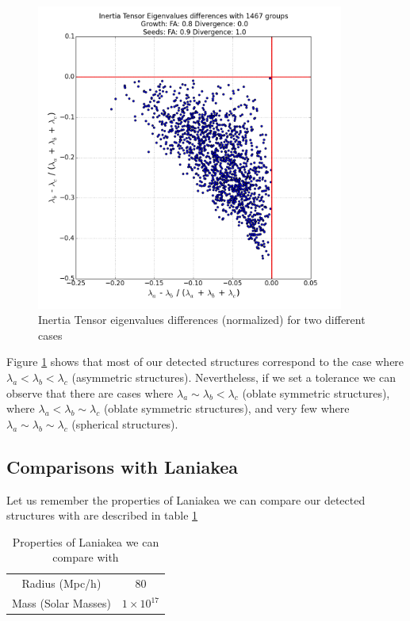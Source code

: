 \documentclass[12pt]{article}
\begin{document}
\begin{figure}[ht]
\begin{minipage}{.5\textwidth}
  \includegraphics[width=0.9\textwidth]{groups/inertiaplots/inertia_diff_09_Trace_10_search_FA_08_Trace_00.png}
\end{minipage}
\caption{Inertia Tensor eigenvalues differences (normalized) for two different cases}
\label{fg:inertia_diff}
\end{figure}
\FloatBarrier

\begin{par}
Figure \ref{fg:inertia_diff} shows that most of our
 detected structures correspond to the case where
  $\lambda_a < \lambda_b < \lambda_c$ (asymmetric
   structures). Nevertheless, if we set a tolerance we
    can observe that there are cases where $\lambda_a
     \sim \lambda_b < \lambda_c$ (oblate symmetric
      structures), where $\lambda_a < \lambda_b \sim
       \lambda_c$ (oblate symmetric structures), and very
        few where $\lambda_a \sim \lambda_b \sim
         \lambda_c$ (spherical structures).
\end{par}

\subsection{Comparisons with Laniakea}
\begin{par}
 Let us remember the properties of Laniakea we can compare our detected structures with are described in table \ref{tab:laniakea}
\end{par}
\begin{table}[ht]
    \centering
    \begin{tabular}{|c|c|}
        Radius (Mpc/h) & 80  \\
        Mass (Solar Masses) & $1 \times 10^{17}$  \\
    \end{tabular}
    \caption{Properties of Laniakea we can compare with}
    \label{tab:laniakea}
\end{table}
\FloatBarrier
\end{document}
